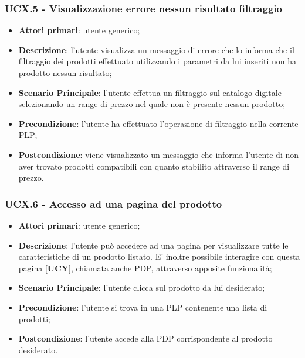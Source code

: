 \subsubsection{UCX.5 - Visualizzazione errore nessun risultato filtraggio}
\begin{itemize}
\item \textbf{Attori primari}: utente generico;
\item \textbf{Descrizione}: l'utente visualizza un messaggio di errore che lo informa che il filtraggio dei prodotti effettuato utilizzando i parametri da lui inseriti non ha prodotto nessun risultato;
\item \textbf{Scenario Principale}: l'utente effettua un filtraggio sul catalogo digitale selezionando un range di prezzo nel quale non è presente nessun prodotto;
\item \textbf{Precondizione}: l'utente ha effettuato l'operazione di filtraggio nella corrente PLP;
\item \textbf{Postcondizione}: viene visualizzato un messaggio che informa l'utente di non aver trovato prodotti compatibili con quanto stabilito attraverso il range di prezzo.
\end{itemize}
\subsubsection{UCX.6 - Accesso ad una pagina del prodotto}
\begin{itemize}
\item \textbf{Attori primari}: utente generico;
\item \textbf{Descrizione}: l'utente può accedere ad una pagina per visualizzare tutte le caratteristiche di un prodotto listato. E' inoltre possibile interagire con questa pagina [\textbf{UCY}], chiamata anche PDP, attraverso apposite funzionalità;
\item \textbf{Scenario Principale}: l'utente clicca sul prodotto da lui desiderato;
\item \textbf{Precondizione}: l'utente si trova in una PLP contenente una lista di prodotti;
\item \textbf{Postcondizione}: l'utente accede alla PDP corrispondente al prodotto desiderato.
\end{itemize}